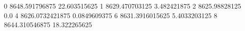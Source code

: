 0 8648.591796875 22.603515625
1 8629.470703125 3.482421875
2 8625.98828125 0.0
4 8626.0732421875 0.0849609375
6 8631.3916015625 5.4033203125
8 8644.310546875 18.322265625
